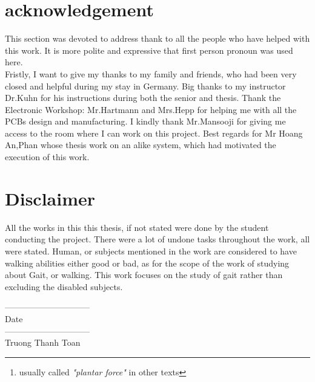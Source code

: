 \documentclass[12 pt, a4paper]{thesis}
\begin{document}
\vfill\noindent
\tableofcontents
\listoffigures
\listoftables
\chapter*{acknowledgement}
This section was devoted to address thank to all the people who have helped with this work. It is more polite and expressive that first person pronoun was used here.\\
Fristly, I want to give my thanks to my family and friends, who had been very closed and helpful during my stay in Germany. Big thanks to my instructor Dr.Kuhn for his instructions during both the senior and thesis. Thank the Electronic Workshop: Mr.Hartmann and Mrs.Hepp for helping me with all the PCBs design and manufacturing. I kindly thank Mr.Mansooji for giving me access to the room where I can work on this project. Best regards for Mr Hoang An,Phan whose thesis work on an alike system, which had motivated the execution of this work. 
\chapter*{Disclaimer}
All the works in this this thesis, if not stated were done by the student conducting the project. There were a lot of undone tasks throughout the work, all were stated. Human, or subjects mentioned in the work are considered to have walking abilities either good or bad, as for the scope of the work of studying about Gait, or walking. This work focuses on the study of gait rather than excluding the disabled subjects.
\vspace{30mm}
\begin{multicols}{2}
\centering

------------------------------ \\

Date\\ 

------------------------------ \\
Truong Thanh Toan\\


\end{multicols}
\pagebreak 
\begin{abstract}
	This thesis introduce about data collection of gait in foot area, with an aid of a Sensor-Shoe system on the left foot. The data includes acceleration, angular velocity and ground-reaction force\footnote{usually called \textit{"plantar force"} in other texts}.
Throughout the text, software application of the detecting algorithm, and the manufacturing of the hardware are covered. In the end a full-fledged SensorShoe system was realized and tested.
\end{abstract}
\end{document}
